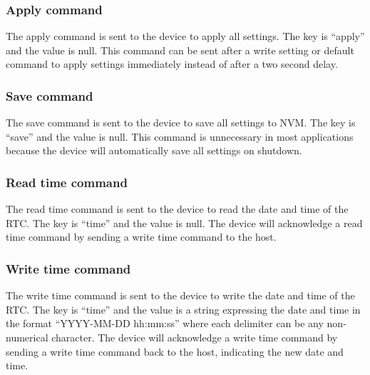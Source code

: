 \subsubsection{Apply command}

The apply command is sent to the device to apply all settings.  The key is \enquote{apply} and the value is null.  This command can be sent after a write setting or default command to apply settings immediately instead of after a two second delay.


\subsubsection{Save command}

The save command is sent to the device to save all settings to \ac{NVM}.  The key is \enquote{save} and the value is null.  This command is unnecessary in most applications because the device will automatically save all settings on shutdown.


\subsubsection{Read time command}

The read time command is sent to the device to read the date and time of the \ac{RTC}.  The key is \enquote{time} and the value is null.  The device will acknowledge a read time command by sending a write time command to the host.


\subsubsection{Write time command}

The write time command is sent to the device to write the date and time of the \ac{RTC}.  The key is \enquote{time} and the value is a string expressing the date and time in the format \enquote{YYYY-MM-DD hh:mm:ss} where each delimiter can be any non-numerical character.  The device will acknowledge a write time command by sending a write time command back to the host, indicating the new date and time.



